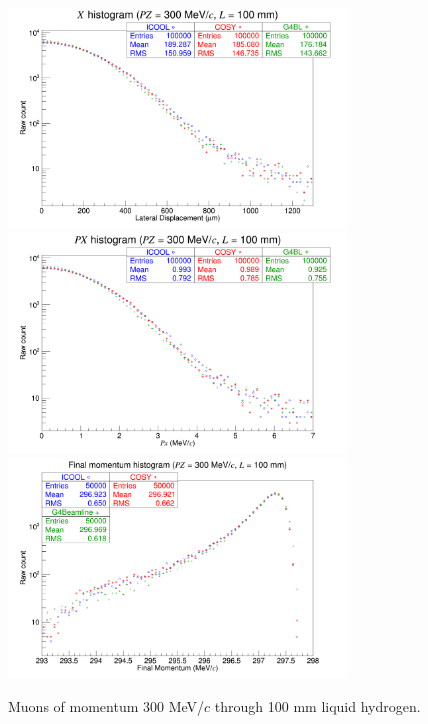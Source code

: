 \begin{figure}[!htb]
  \centering
    \includegraphics[width=0.8\textwidth]{Validation/LH/X.300.100.png} 
    \includegraphics[width=0.8\textwidth]{Validation/LH/PX.300.100.png} 
    \includegraphics[width=0.8\textwidth]{Validation/LH/strag.300.100.png} 
  \caption{Muons of momentum 300 MeV/$c$ through 100 mm liquid hydrogen.}
  \label{fig:300.100}
\end{figure}

